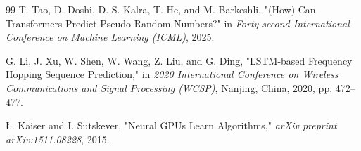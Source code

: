 \documentclass[12pt,a4paper]{report}
\theoremstyle{plain}
\begin{document}
\begin{thebibliography}{99}
T. Tao, D. Doshi, D. S. Kalra, T. He, and M. Barkeshli, "(How) Can Transformers Predict Pseudo-Random Numbers?" in \textit{Forty-second International Conference on Machine Learning (ICML)}, 2025.

G. Li, J. Xu, W. Shen, W. Wang, Z. Liu, and G. Ding, "LSTM-based Frequency Hopping Sequence Prediction," in \textit{2020 International Conference on Wireless Communications and Signal Processing (WCSP)}, Nanjing, China, 2020, pp. 472--477.

\L. Kaiser and I. Sutskever, "Neural GPUs Learn Algorithms," \textit{arXiv preprint arXiv:1511.08228}, 2015.

\end{thebibliography}
\end{document}
